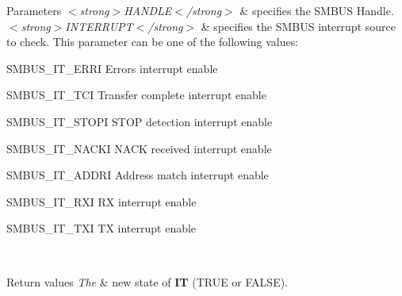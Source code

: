\begin{DoxyParams}{Parameters}
{\em $<$strong$>$\+H\+A\+N\+D\+L\+E$<$/strong$>$} & specifies the S\+M\+B\+US Handle. \\
\hline
{\em $<$strong$>$\+I\+N\+T\+E\+R\+R\+U\+P\+T$<$/strong$>$} & specifies the S\+M\+B\+US interrupt source to check. This parameter can be one of the following values\+: \begin{DoxyItemize}
\item S\+M\+B\+U\+S\+\_\+\+I\+T\+\_\+\+E\+R\+RI Errors interrupt enable \item S\+M\+B\+U\+S\+\_\+\+I\+T\+\_\+\+T\+CI Transfer complete interrupt enable \item S\+M\+B\+U\+S\+\_\+\+I\+T\+\_\+\+S\+T\+O\+PI S\+T\+OP detection interrupt enable \item S\+M\+B\+U\+S\+\_\+\+I\+T\+\_\+\+N\+A\+C\+KI N\+A\+CK received interrupt enable \item S\+M\+B\+U\+S\+\_\+\+I\+T\+\_\+\+A\+D\+D\+RI Address match interrupt enable \item S\+M\+B\+U\+S\+\_\+\+I\+T\+\_\+\+R\+XI RX interrupt enable \item S\+M\+B\+U\+S\+\_\+\+I\+T\+\_\+\+T\+XI TX interrupt enable\end{DoxyItemize}
\\
\hline
\end{DoxyParams}

\begin{DoxyRetVals}{Return values}
{\em The} & new state of {\bfseries IT} (T\+R\+UE or F\+A\+L\+SE). \\
\hline
\end{DoxyRetVals}
\mbox{\label{group___s_m_b_u_s___exported___macros_gaf61fb602592d45225b4c7a4f4ac95127}} 

